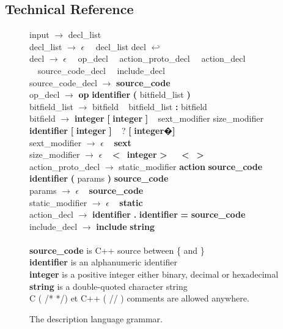 \newpage

\subsection{Technical Reference}

\begin{figure}[p]
input $\rightarrow$ decl\_list\\
decl\_list $\rightarrow$ $\epsilon$ \textbar~~decl\_list decl {\bf $\hookleftarrow$}\\
decl $\rightarrow$ $\epsilon$ \textbar~~op\_decl \textbar~~action\_proto\_decl \textbar~~action\_decl \textbar~~source\_code\_decl \textbar~~include\_decl\\
source\_code\_decl $\rightarrow$ {\bf source\_code}\\
op\_decl $\rightarrow$ {\bf op} {\bf identifier} {\bf (} bitfield\_list {\bf )}\\
bitfield\_list $\rightarrow$ bitfield \textbar~ bitfield\_list {\bf :} bitfield\\
bitfield $\rightarrow$ {\bf integer} {\bf [} {\bf integer} {\bf ]} \textbar~ sext\_modifier size\_modifier {\bf identifier} {\bf [} {\bf integer} {\bf ]} \textbar~ ? {\bf [} {\bf integer}�{\bf ]}\\
sext\_modifier $\rightarrow$ $\epsilon$ \textbar~ {\bf sext}\\
size\_modifier $\rightarrow$ $\epsilon$ \textbar~ {\bf \textless}~ {\bf integer} {\bf \textgreater}~ \textbar~ {\bf \textless}~ {\bf \textgreater}~\\
action\_proto\_decl $\rightarrow$ static\_modifier {\bf action} {\bf source\_code} {\bf identifier} {\bf (} params {\bf )} {\bf source\_code}\\
params $\rightarrow$ $\epsilon$ \textbar~ {\bf source\_code}\\
static\_modifier $\rightarrow$ $\epsilon$ \textbar~ {\bf static}\\
action\_decl $\rightarrow$ {\bf identifier} {\bf.} {\bf identifier} {\bf =} {\bf source\_code}\\
include\_decl $\rightarrow$ {\bf include} {\bf string}\\
\\
{\bf source\_code} is C++ source between \{ and \}\\
{\bf identifier} is an alphanumeric identifier\\
{\bf integer} is a positive integer either binary, decimal or hexadecimal\\
{\bf string} is a double-quoted character string\\
C ( /* */) et C++ ( // ) comments are allowed anywhere.
\caption{The description language grammar.}
\label{grammar}
\end{figure}
